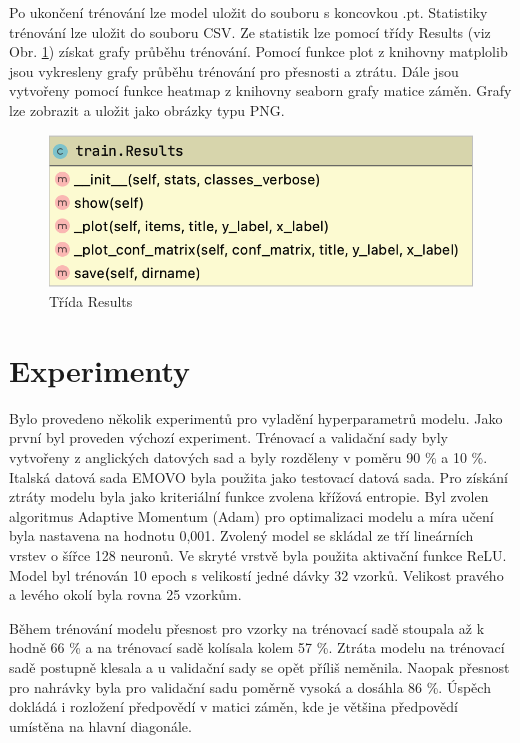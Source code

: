 \documentclass[FM,BP]{tulthesis}
\begin{document}
Po ukončení trénování lze model uložit do souboru s koncovkou .pt. Statistiky trénování lze uložit do souboru CSV. Ze statistik lze pomocí třídy Results (viz Obr. \ref{fig:results}) získat grafy průběhu trénování. Pomocí funkce plot z knihovny matplolib jsou vykresleny grafy průběhu trénování pro přesnosti a ztrátu. Dále jsou vytvořeny pomocí funkce heatmap z knihovny seaborn grafy matice záměn. Grafy lze zobrazit a uložit jako obrázky typu PNG.

\begin{figure}[ht]
\centerline{\includegraphics[scale=.3]{train-results.png}}
\caption{Třída Results}
\label{fig:results}
\end{figure}
\FloatBarrier

\chapter{Experimenty}
Bylo provedeno několik experimentů pro vyladění hyperparametrů modelu. Jako první byl proveden výchozí experiment. Trénovací a validační sady byly vytvořeny z anglických datových sad a byly rozděleny v poměru 90 \% a 10 \%. 
Italská datová sada EMOVO byla použita jako testovací datová sada. Pro získání ztráty modelu byla jako kriteriální funkce zvolena křížová entropie. Byl zvolen algoritmus Adaptive Momentum (Adam) pro optimalizaci modelu a míra učení byla nastavena na hodnotu 0,001. Zvolený model se skládal ze tří lineárních vrstev o šířce 128 neuronů. Ve skryté vrstvě byla použita aktivační funkce ReLU. Model byl trénován 10 epoch s velikostí jedné dávky 32 vzorků. Velikost pravého a levého okolí byla rovna 25 vzorkům.

Během trénování modelu přesnost pro vzorky na trénovací sadě stoupala až k hodně 66 \% a na trénovací sadě kolísala kolem 57 \%. Ztráta modelu na trénovací sadě postupně klesala a u validační sady se opět příliš neměnila. Naopak přesnost pro nahrávky byla pro validační sadu poměrně vysoká a dosáhla 86 \%. Úspěch dokládá i rozložení předpovědí v matici záměn, kde je většina předpovědí umístěna na hlavní diagonále.
\end{document}
